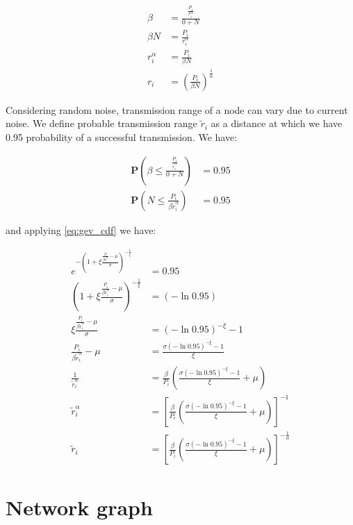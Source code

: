 \documentclass[a4paper,12pt]{report}
\begin{document}
\begin{align*}
\beta &= \frac{\frac{P_i}{r_i^\alpha}}{0 + N} \\
\beta N &= \frac{P_i}{r_i^\alpha} \\
r_i^\alpha &= \frac{P_i}{\beta N} \\
r_i &= \left( \frac{P_i}{\beta N} \right)^{\frac{1}{\alpha}}
\end{align*}

Considering random noise, transmission range of a node can vary due to current noise. We define probable transmission range $\tilde{r}_i$ as a distance at which we have 0.95 probability of a successful transmission.  We have:

\begin{align*}
\textbf{P}  \left( \beta \leq \frac{\frac{P_i}{\tilde{r}_i^\alpha}}{0 + N} \right) &= 0.95 \\
\textbf{P}  \left( N \leq \frac{P_i}{\beta \tilde{r}_i^\alpha} \right) &=  0.95
\end{align*}

and applying \eqref{eq:gev_cdf} we have:

\begin{align}
e^{-\left(1 + \xi \frac{\frac{P_i}{\beta \tilde{r}_i^\alpha}  - \mu}{\sigma}\right) ^ {-\frac{1}{\xi}}}& = 0.95 \nonumber \\
\left(1 + \xi \frac{\frac{P_i}{\beta \tilde{r}_i^\alpha}  - \mu}{\sigma}\right) ^ {-\frac{1}{\xi}} &= (- \ln 0.95) \nonumber \\
\xi \frac{\frac{P_i}{\beta \tilde{r}_i^\alpha}  - \mu}{\sigma} &= (- \ln 0.95)^{-\xi} - 1\nonumber \\
\frac{P_i}{\beta \tilde{r}_i^\alpha}  - \mu &= \frac{\sigma (- \ln 0.95)^{-\xi} - 1}{\xi} \nonumber\\
\frac{1}{\tilde{r}_i^\alpha} &= \frac{\beta}{P_i} \left( \frac{\sigma (- \ln 0.95)^{-\xi} - 1}{\xi} + \mu \right)\nonumber \\
\tilde{r}_i^\alpha  &= \left[ \frac{\beta}{P_i} \left( \frac{\sigma (- \ln 0.95)^{-\xi} - 1}{\xi} + \mu \right) \right]^{-1}\nonumber \\
\tilde{r}_i  &= \left[ \frac{\beta}{P_i} \left( \frac{\sigma (- \ln 0.95)^{-\xi} - 1}{\xi} + \mu \right) \right]^{-\frac{1}{\alpha}}
\end{align}

\chapter{Network graph}
\end{document}

